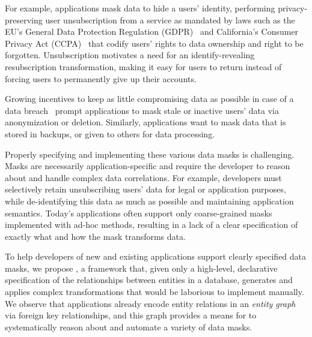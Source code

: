 For example, applications mask data to hide a users' identity, performing privacy-preserving user
unsubscription from a service as mandated by laws such as the EU's General Data Protection
Regulation (GDPR)~\cite{eu:gdpr} and California's Consumer Privacy Act (CCPA)~\cite{ca:privacy-act}
that codify users' rights to data ownership and right to be forgotten. Unsubscription motivates a
need for an identify-revealing resubscription transformation, making it easy for users to return
instead of forcing users to permanently give up their accounts.

Growing incentives to keep as little compromising data as possible in case of a data
breach~\cite{breach:amazon,breach:twitter, breach:fb, breach:marriott, breach:quora} prompt
applications to mask stale or inactive users' data via anonymization or deletion. Similarly,
applications want to mask data that is stored in backups, or given to others for data processing.


Properly specifying and implementing these various data masks is challenging. Masks are necessarily
application-specific and require the developer to reason about and handle complex data correlations.
For example, developers must selectively retain unsubscribing users' data for legal or application
purposes, while de-identifying this data as much as possible and maintaining application semantics.
Today's applications often support only coarse-grained masks implemented with ad-hoc methods,
resulting in a lack of a clear specification of exactly what and how the mask transforms data.

To help developers of new and existing applications support clearly specified data masks, we propose
\sys, a framework that, given only a high-level, declarative specification of the relationships
between entities in a database, generates and applies complex transformations that would be
laborious to implement manually. We observe that applications already encode entity
relations in an \emph{entity graph} via foreign key relationships, and this graph provides a means
for \sys to systematically reason about and automate a variety of data masks.

